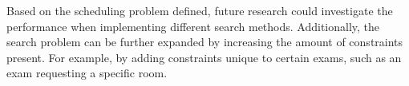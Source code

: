 Based on the scheduling problem defined, future research could investigate the performance when implementing different search methods. Additionally, the search problem can be further expanded by increasing the amount of constraints present. For example, by adding constraints unique to certain exams, such as an exam requesting a specific room.





